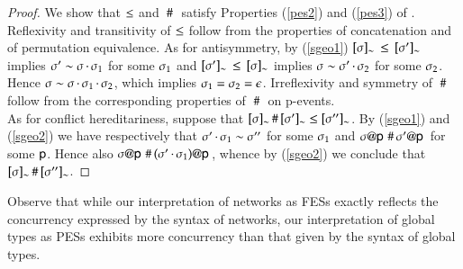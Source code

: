 \begin{proof}
  We show that $\leq$ and $~\#~$ satisfy Properties (\ref{pes2}) and
  (\ref{pes3}) of . Reflexivity and transitivity of
  $\leq$ follow from the properties of concatenation and of
  permutation equivalence. As for antisymmetry, by
  (\ref{sgeo1}) $[\sigma]_{\sim}\,\leq
  \,[\sigma']_{\sim}$ implies $\sigma' \sim
  \sigma\,{\cdot}\,\sigma_1$ for some $\sigma_1$ and
  $[\sigma']_{\sim}\,\leq \,[\sigma]_{\sim}$ implies $\sigma \sim
  \sigma'\,{\cdot}\,\sigma_2$ for some $\sigma_2$.  Hence $\sigma
  \sim \sigma\,{\cdot}\,\sigma_1\,{\cdot}\,\sigma_2$, which implies
  $\sigma_1 = \sigma_2 = \epsilon$.  Irreflexivity and symmetry of $~\#~$
  follow from the corresponding properties of $~\#~$ on p-events. \\ 
    As for conflict hereditariness, suppose that $[\sigma]_{\sim} \,\#\,
  [\sigma']_{\sim}\leq [\sigma'']_{\sim}$.  By
  (\ref{sgeo1}) and (\ref{sgeo2}) we have respectively
  that $\sigma'\,{\cdot}\,\sigma_1\sim\sigma''$ for some
  ${\sigma_1}$ and $\sigma @ {\sf p}\,\,\#\,\sigma' @ {\sf p}\,$ for some
  ${\sf p}$.  Hence also
  $\sigma @ {\sf p}\,\,\#\,(\sigma'\,{\cdot}\,\sigma_1) @ {\sf p}\,$,
  whence by (\ref{sgeo2}) we conclude that
  $[\sigma]_{\sim} \,\#\, [\sigma'']_{\sim}$. 
\end{proof}



Observe that while our interpretation of networks as FESs exactly
reflects the concurrency expressed by the syntax of networks, our
interpretation of global types as PESs exhibits more concurrency than
that given by the syntax of global types.

